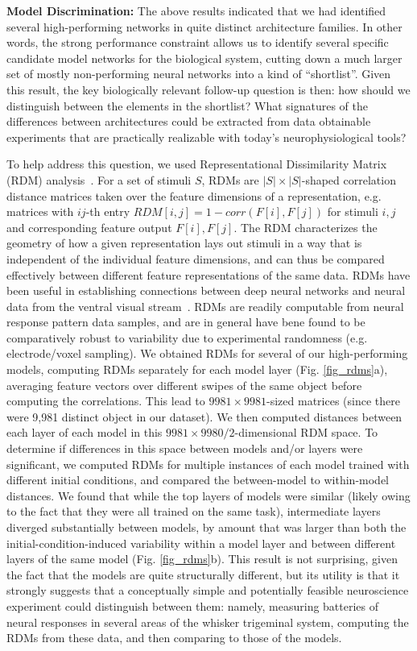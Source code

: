 \textbf{Model Discrimination:}  The above results indicated that we had identified several high-performing networks in quite distinct architecture families.
In other words, the strong performance constraint allows us to identify several specific candidate model networks for the biological system, cutting down a much larger set of mostly non-performing neural networks into a kind of ``shortlist''.
Given this result, the key biologically relevant follow-up question is then: how should we distinguish between the elements in the shortlist?
What signatures of the differences between architectures could be extracted from data obtainable experiments that are practically realizable with today's neurophysiological tools?

To help address this question, we used Representational Dissimilarity Matrix (RDM) analysis~\cite{Kriegeskorte2008}.
For a set of stimuli $S$, RDMs are $|S| \times |S|$-shaped correlation distance matrices taken over the feature dimensions of a representation, e.g. matrices with $ij$-th entry $RDM[i, j] = 1 - corr(F[i], F[j])$ for stimuli $i, j$ and corresponding feature output $F[i], F[j]$.
The RDM characterizes the geometry of how a given representation lays out stimuli in a way that is independent of the individual feature dimensions, and can thus be compared effectively between different feature representations of the same data.
RDMs have been useful in establishing connections between deep neural networks and neural data from the ventral visual stream~\cite{cadieu2014deep, Yamins2014, khaligh2014deep}. 
RDMs are readily computable from neural response pattern data samples, and are in general have bene found to be comparatively robust to variability due to experimental randomness (e.g. electrode/voxel sampling).
We obtained RDMs for several of our high-performing models, computing RDMs separately for each model layer (Fig. \ref{fig_rdms}a), averaging feature vectors over different swipes of the same object before computing the correlations.
This lead to $9981\times9981$-sized matrices (since there were 9,981 distinct object in our dataset).
We then computed distances between each layer of each model in this $9981\times9980/2$-dimensional RDM space.
To determine if differences in this space between models and/or layers were significant, we computed RDMs for multiple instances of each model trained with different initial conditions, and compared the between-model to within-model distances.
We found that while the top layers of models were similar (likely owing to the fact that they were all trained on the same task), intermediate layers diverged substantially between models, by amount that was larger than both the initial-condition-induced variability within a model layer and between different layers of the same model (Fig. \ref{fig_rdms}b).
This result is not surprising, given the fact that the models are quite structurally different, but its utility is that it strongly suggests that a conceptually simple and potentially feasible neuroscience experiment could distinguish between them: namely, measuring batteries of neural responses in several areas of the whisker trigeminal system, computing the RDMs from these data, and then comparing to those of the models. 



